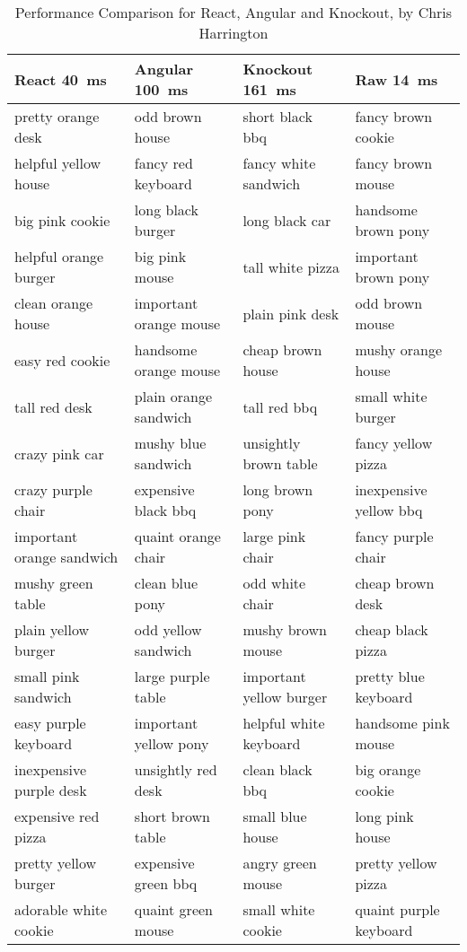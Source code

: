 	\begin{table}
		\scriptsize
		\centering
		\begin{tabular}{@{}llll@{}}
			\toprule
				React \hfill \SI{40}{\milli\second} & Angular \hfill \SI{100}{\milli\second} & Knockout \hfill \SI{161}{\milli\second} & Raw \hfill \SI{14}{\milli\second} \\ \midrule
				pretty orange desk & odd brown house & short black bbq & fancy brown cookie \\
				helpful yellow house & fancy red keyboard & fancy white sandwich & fancy brown mouse \\
				big pink cookie & long black burger & long black car & handsome brown pony \\
				helpful orange burger & big pink mouse & tall white pizza & important brown pony \\
				clean orange house & important orange mouse & plain pink desk & odd brown mouse \\
				easy red cookie & handsome orange mouse & cheap brown house & mushy orange house \\
				tall red desk & plain orange sandwich & tall red bbq & small white burger \\
				crazy pink car & mushy blue sandwich & unsightly brown table & fancy yellow pizza \\
				crazy purple chair & expensive black bbq & long brown pony & inexpensive yellow bbq \\
				important orange sandwich & quaint orange chair & large pink chair & fancy purple chair \\
				mushy green table & clean blue pony & odd white chair & cheap brown desk \\
				plain yellow burger & odd yellow sandwich & mushy brown mouse & cheap black pizza \\
				small pink sandwich & large purple table & important yellow burger & pretty blue keyboard \\
				easy purple keyboard & important yellow pony & helpful white keyboard & handsome pink mouse \\
				inexpensive purple desk & unsightly red desk & clean black bbq & big orange cookie \\
				expensive red pizza & short brown table & small blue house & long pink house \\
				pretty yellow burger & expensive green bbq & angry green mouse & pretty yellow pizza \\
				adorable white cookie & quaint green mouse & small white cookie & quaint purple keyboard \\
			\bottomrule
		\end{tabular}
	\caption{Performance Comparison for React, Angular and Knockout, by Chris Harrington}
	\label{tbl:perfcompharrington}
	\end{table}
	
